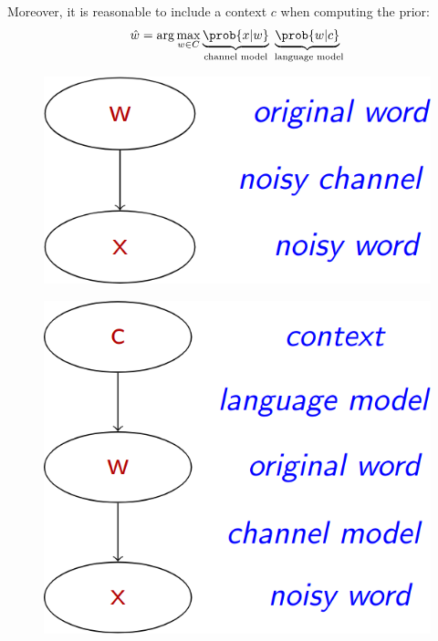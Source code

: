 \begin{description}
\begin{minipage}{0.7\linewidth}
            Moreover, it is reasonable to include a context $c$ when computing the prior:
            \[ \hat{w} = \arg\max_{w \in C} \underbrace{\prob{x|w}}_{\text{channel model}} \underbrace{\prob{w|c}}_{\text{ language model}} \]
        \end{minipage}
        \hfill
        \begin{minipage}{0.27\linewidth}
            \begin{figure}[H]
                \centering
                \includegraphics[width=\linewidth]{./img/noisy_channel1.png}
            \end{figure}
            \vspace{2.5em}
            \begin{figure}[H]
                \centering
                \includegraphics[width=\linewidth]{./img/noisy_channel2.png}
            \end{figure}
        \end{minipage}


\end{description}
